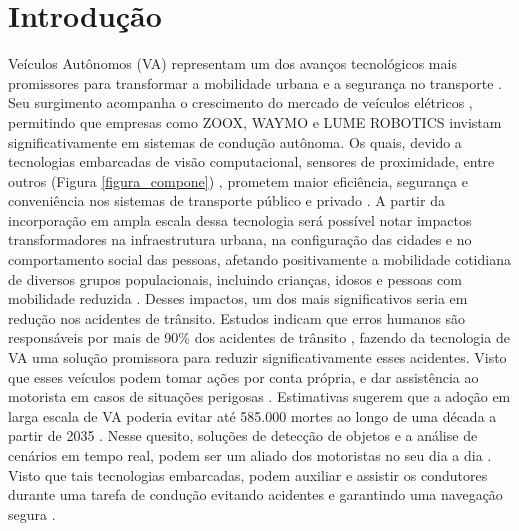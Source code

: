 \documentclass[
	12pt,				%
	oneside, %
	a4paper,			%
	english,			%
	french,				%
	spanish,			%
	brazil				%
	]{abntex2}
\begin{document}
\chapter[Introdução]{Introdução} 
\label{introducao_cap}
Veículos Autônomos (VA) representam um dos avanços tecnológicos mais promissores para transformar a mobilidade urbana e a segurança no transporte \cite{eu_safer_roads, mundobrasil}. Seu surgimento acompanha o crescimento do mercado de veículos elétricos \cite{sebo2024impact}, permitindo que empresas como ZOOX\textsuperscript{\textregistered}, WAYMO\textsuperscript{\textregistered} e LUME ROBOTICS\textsuperscript{\textregistered} invistam significativamente em sistemas de condução autônoma. Os quais, devido a tecnologias embarcadas de visão computacional, sensores de proximidade, entre outros (Figura \ref{figura_compone})%
, prometem maior eficiência, segurança e conveniência nos sistemas de transporte público e privado \cite{Center_of_Automotive_Management2022, review-auto, intro-pm}. A partir da incorporação em ampla escala dessa tecnologia será possível notar %
impactos transformadores na infraestrutura urbana, na configuração das cidades e no comportamento social das pessoas, afetando positivamente a mobilidade cotidiana de diversos grupos populacionais, incluindo crianças, idosos e pessoas com mobilidade reduzida \cite{4cenarios_ocidental, KPMG}. Desses impactos, um dos mais significativos seria em redução nos acidentes de trânsito. Estudos indicam que erros humanos são responsáveis por mais de 90\% dos acidentes de trânsito \cite{nhtsa_crash_causation}, fazendo da tecnologia de VA uma solução promissora para reduzir significativamente esses acidentes. Visto que esses veículos podem tomar ações por conta própria, e dar assistência ao motorista em casos de situações perigosas \cite{okpono2024advanced}. Estimativas sugerem que a adoção em larga escala de VA poderia evitar até 585.000 mortes ao longo de uma década a partir de 2035 \cite{lanctot_passenger_economy}. %
Nesse quesito, soluções de detecção de objetos e a análise de cenários em tempo real, podem ser um aliado dos motoristas no seu dia a dia \cite{fhwa_speed_crashes}. Visto que tais tecnologias embarcadas, podem auxiliar e assistir os condutores durante uma tarefa de condução %
evitando acidentes e garantindo uma navegação segura \cite{janai_computer_vision_av}.
\end{document}
